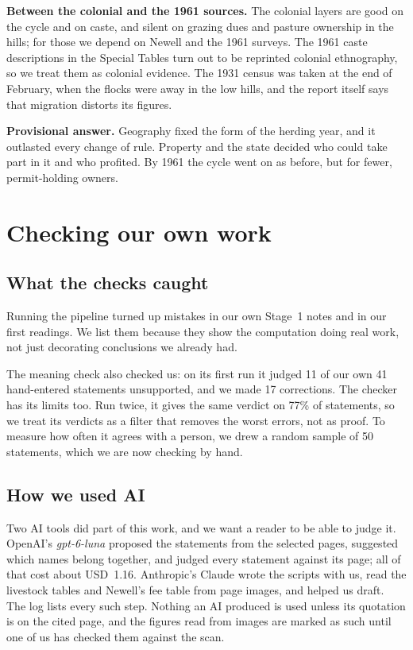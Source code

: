 \documentclass[10pt,a4paper,twocolumn]{article}
\begin{document}
\textbf{Between the colonial and the 1961 sources.} The colonial layers are good on the cycle and on caste, and silent on grazing dues and pasture ownership in the hills; for those we depend on Newell and the 1961 surveys. The 1961 caste descriptions in the Special Tables turn out to be reprinted colonial ethnography, so we treat them as colonial evidence. The 1931 census was taken at the end of February, when the flocks were away in the low hills, and the report itself says that migration distorts its figures.

\begin{finding}
\textbf{Provisional answer.} Geography fixed the form of the herding year, and it outlasted every change of rule. Property and the state decided who could take part in it and who profited. By 1961 the cycle went on as before, but for fewer, permit-holding owners.
\end{finding}

\section{Checking our own work}\label{sec:checks}

\subsection{What the checks caught}

Running the pipeline turned up mistakes in our own Stage~1 notes and in our first readings. We list them because they show the computation doing real work, not just decorating conclusions we already had.



The meaning check also checked us: on its first run it judged 11 of our own 41 hand-entered statements unsupported, and we made 17 corrections. The checker has its limits too. Run twice, it gives the same verdict on 77\% of statements, so we treat its verdicts as a filter that removes the worst errors, not as proof. To measure how often it agrees with a person, we drew a random sample of 50 statements, which we are now checking by hand.

\subsection{How we used AI}

Two AI tools did part of this work, and we want a reader to be able to judge it. OpenAI's \emph{gpt-6-luna} proposed the statements from the selected pages, suggested which names belong together, and judged every statement against its page; all of that cost about USD~1.16. Anthropic's Claude wrote the scripts with us, read the livestock tables and Newell's fee table from page images, and helped us draft. The log lists every such step. Nothing an AI produced is used unless its quotation is on the cited page, and the figures read from images are marked as such until one of us has checked them against the scan.
\end{document}
